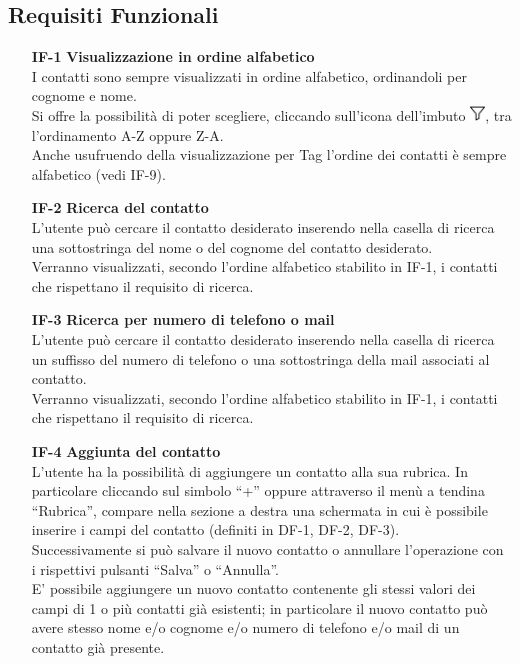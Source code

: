 \subsection{Requisiti Funzionali}
	\begin{tcolorbox}[breakable, colback=white,colframe=black!80!white,title=\textbf{Funzionalità individuali IF}]
	\begin{itemize}[itemsep=2pt, topsep=0pt]
		\item[\textbf{IF-1}] \textbf{Visualizzazione in ordine alfabetico}
		\\I contatti sono sempre visualizzati in ordine alfabetico, ordinandoli per cognome e nome.
		\\Si offre la possibilità di poter scegliere, cliccando sull’icona dell’imbuto \includegraphics[height=0.4cm]{images/imbuto_icona.jpeg}, tra l’ordinamento A-Z oppure Z-A.
		\\Anche usufruendo della visualizzazione per Tag l’ordine dei contatti è sempre alfabetico (vedi IF-9).
		
		\item[\textbf{IF-2}] \textbf{Ricerca del contatto}
		\\L’utente può cercare il contatto desiderato inserendo nella casella di ricerca una sottostringa del nome o del cognome del contatto desiderato.
		\\Verranno visualizzati, secondo l’ordine alfabetico stabilito in IF-1, i contatti che rispettano il requisito di ricerca.
		
		\item[\textbf{IF-3}] \textbf{Ricerca per numero di telefono o mail}
		\\L’utente può cercare il contatto desiderato inserendo nella casella di ricerca un suffisso del numero di telefono o una sottostringa della mail associati al contatto. 
		\\Verranno visualizzati, secondo l’ordine alfabetico stabilito in IF-1, i contatti che rispettano il requisito di ricerca.		
		
		\item[\textbf{IF-4}] \textbf{Aggiunta del contatto}
		\\L’utente ha la possibilità di aggiungere un contatto alla sua rubrica.
		In particolare cliccando sul simbolo “+” oppure attraverso il menù a tendina “Rubrica”, compare nella sezione a destra una
		schermata in cui è possibile inserire i campi del contatto (definiti in 
		DF-1, DF-2, DF-3).
		\\Successivamente si può salvare il nuovo contatto o annullare  
		l’operazione con i rispettivi pulsanti “Salva” o “Annulla”.
		\\E’ possibile aggiungere un nuovo contatto contenente gli stessi valori dei campi di 1 o più contatti già esistenti; in particolare il nuovo contatto può avere stesso nome e/o cognome e/o numero di telefono e/o mail di un contatto già presente.		
		

\end{itemize}
\end{tcolorbox}
